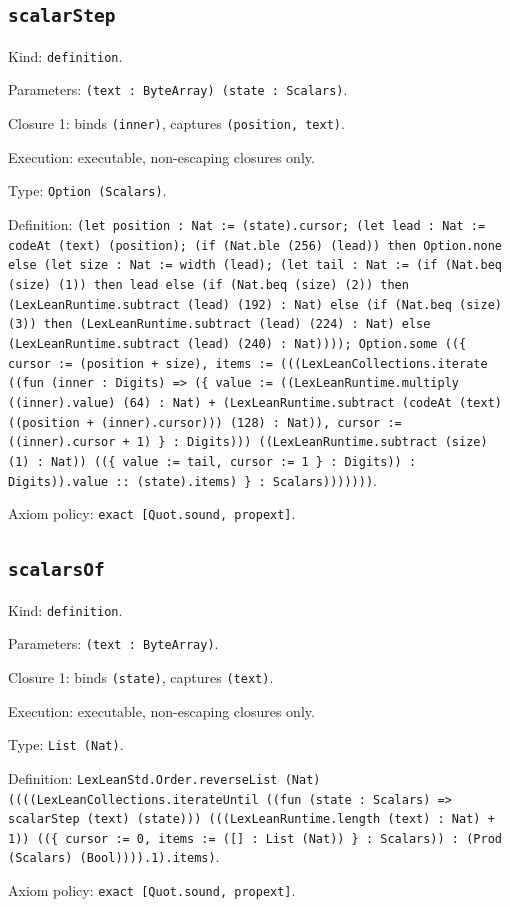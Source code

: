 \documentclass[11pt]{article}
\begin{document}
\subsection*{\texttt{scalarStep}}
\noindent Kind: \texttt{definition}.\par
\noindent Parameters: \texttt{(text : ByteArray) (state : Scalars)}.\par
\noindent Closure 1: binds \texttt{(inner)}, captures \texttt{(position, text)}.\par
\noindent Execution: executable, non-escaping closures only.\par
\noindent Type: \texttt{Option (Scalars)}.\par
\noindent Definition: \texttt{(let position : Nat := (state).cursor; (let lead : Nat := codeAt (text) (position); (if (Nat.ble (256) (lead)) then Option.none else (let size : Nat := width (lead); (let tail : Nat := (if (Nat.beq (size) (1)) then lead else (if (Nat.beq (size) (2)) then (LexLeanRuntime.subtract (lead) (192) : Nat) else (if (Nat.beq (size) (3)) then (LexLeanRuntime.subtract (lead) (224) : Nat) else (LexLeanRuntime.subtract (lead) (240) : Nat)))); Option.some ((\{ cursor := (position + size), items := (((LexLeanCollections.iterate ((fun (inner : Digits) => (\{ value := ((LexLeanRuntime.multiply ((inner).value) (64) : Nat) + (LexLeanRuntime.subtract (codeAt (text) ((position + (inner).cursor))) (128) : Nat)), cursor := ((inner).cursor + 1) \} : Digits))) ((LexLeanRuntime.subtract (size) (1) : Nat)) ((\{ value := tail, cursor := 1 \} : Digits)) : Digits)).value :: (state).items) \} : Scalars)))))))}.\par
\noindent Axiom policy: \texttt{exact [Quot.sound, propext]}.\par
\subsection*{\texttt{scalarsOf}}
\noindent Kind: \texttt{definition}.\par
\noindent Parameters: \texttt{(text : ByteArray)}.\par
\noindent Closure 1: binds \texttt{(state)}, captures \texttt{(text)}.\par
\noindent Execution: executable, non-escaping closures only.\par
\noindent Type: \texttt{List (Nat)}.\par
\noindent Definition: \texttt{LexLeanStd.Order.reverseList (Nat) ((((LexLeanCollections.iterateUntil ((fun (state : Scalars) => scalarStep (text) (state))) (((LexLeanRuntime.length (text) : Nat) + 1)) ((\{ cursor := 0, items := ([] : List (Nat)) \} : Scalars)) : (Prod (Scalars) (Bool)))).1).items)}.\par
\noindent Axiom policy: \texttt{exact [Quot.sound, propext]}.\par
\end{document}
